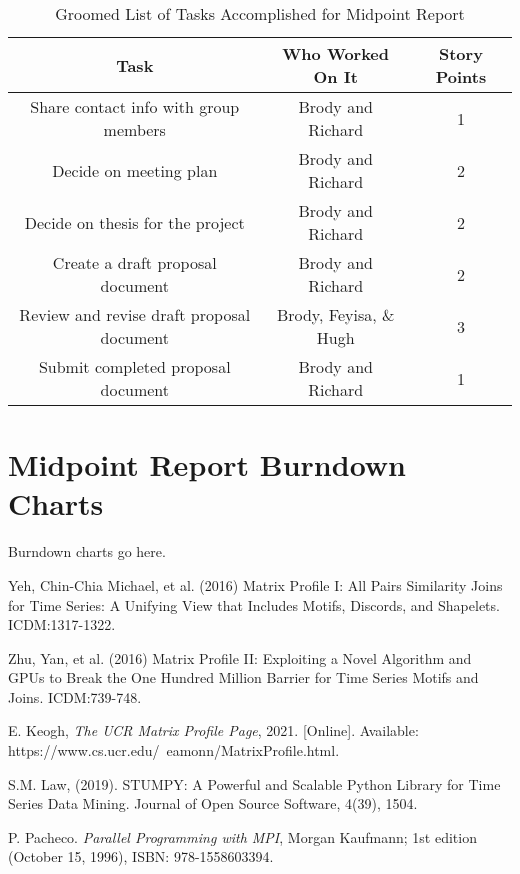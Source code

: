 \documentclass[conference]{IEEEtran}
\begin{document}
\begin{table}
\caption{Groomed List of Tasks Accomplished for Midpoint Report}
\begin{tabular}{|c|c|c|}
\hline
\textbf{Task} & \textbf{Who Worked On It} & \textbf{Story Points} \\ \hline \hline
Share contact info with group members & Brody and Richard & 1 \\ \hline
Decide on meeting plan & Brody and Richard & 2 \\ \hline
Decide on thesis for the project & Brody and Richard & 2 \\ \hline
Create a draft proposal document & Brody and Richard & 2 \\ \hline
Review and revise draft proposal document & Brody, Feyisa, \& Hugh & 3 \\ \hline
Submit completed proposal document & Brody and Richard & 1 \\ \hline
\hline
\end{tabular}
\end{table}

\section{Midpoint Report Burndown Charts}
Burndown charts go here.





\begin{thebibliography}{5}  

 Yeh, Chin-Chia Michael, et al. (2016) Matrix Profile I: All Pairs Similarity Joins for Time Series: A Unifying View that Includes Motifs, Discords, and Shapelets. ICDM:1317-1322.

 Zhu, Yan, et al. (2016) Matrix Profile II: Exploiting a Novel Algorithm and GPUs to Break the One Hundred Million Barrier for Time Series Motifs and Joins. ICDM:739-748.

 E. Keogh, \emph{The UCR Matrix Profile Page}, 2021. [Online]. Available: https://www.cs.ucr.edu/~eamonn/MatrixProfile.html.

 S.M. Law, (2019). STUMPY: A Powerful and Scalable Python Library for Time Series Data Mining. Journal of Open Source Software, 4(39), 1504.

 P. Pacheco. \emph{Parallel Programming with MPI}, Morgan Kaufmann; 1st edition (October 15, 1996), ISBN: 978-1558603394.

\end{thebibliography}
\end{document}
